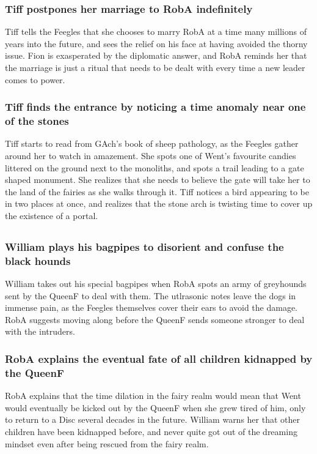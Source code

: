 \subsubsection{\Gls{Tiff} postpones her marriage to \Gls{RobA} indefinitely}
\Gls{Tiff} tells the Feegles that she chooses to marry \Gls{RobA} at a time many millions of years
into the future, and sees the relief on his face at having avoided the thorny issue. \Gls{Fion} is
exasperated by the diplomatic answer, and \Gls{RobA} reminds her that the marriage is just a ritual
that needs to be dealt with every time a new leader comes to power.

\subsubsection{\Gls{Tiff} finds the entrance by noticing a time anomaly near one of the stones}
\Gls{Tiff} starts to read from \Gls{GAch}'s book of sheep pathology, as the Feegles gather around
her to watch in amazement. She spots one of \Gls{Went}'s favourite candies littered on the ground
next to the monoliths, and spots a trail leading to a gate shaped monument. She realizes that she
needs to believe the gate will take her to the land of the fairies as she walks through it.
\Gls{Tiff} notices a bird appearing to be in two places at once, and realizes that the stone arch is
twisting time to cover up the existence of a portal.

\subsection{}
\subsubsection{\Gls{William} plays his bagpipes to disorient and confuse the black hounds}
\Gls{William} takes out his special bagpipes when \Gls{RobA} spots an army of greyhounds sent by
the \Gls{QueenF} to deal with them. The utlrasonic notes leave the dogs in immense pain, as the
Feegles themselves cover their ears to avoid the damage. \Gls{RobA} suggests moving along before
the \Gls{QueenF} sends someone stronger to deal with the intruders.

\subsubsection{\Gls{RobA} explains the eventual fate of all children kidnapped by the \Gls{QueenF}}
\Gls{RobA} explains that the time dilation in the fairy realm would mean that \Gls{Went} would
eventually be kicked out by the \Gls{QueenF} when she grew tired of him, only to return to a Disc
several decades in the future. \Gls{William} warns her that other children have been kidnapped
before, and never quite got out of the dreaming mindset even after being rescued from the fairy
realm.

